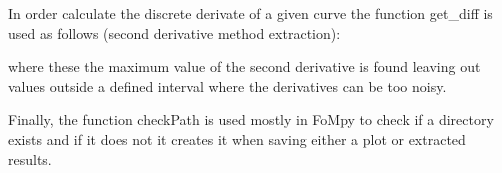\documentclass[letterpaper,10pt,english,openany, oneside]{sphinxmanual}
\begin{document}
%
\begin{sphinxVerbatim}[commandchars=\\\{\}]
   
\PYG{p}{[}\PYG{p}{]}
\end{sphinxVerbatim}

In order calculate the discrete derivate of a given curve the function get\_diff is used as follows (second derivative method
extraction):

%
\begin{sphinxVerbatim}[commandchars=\\\{\}]
     
\PYG{p}{[}\PYG{p}{]}\PYG{p}{[}\PYG{p}{]}
\PYG{p}{[}\PYG{p}{]}\PYG{p}{[}\PYG{p}{]}
  
  
  \PYG{p}{[}\PYG{p}{]}
\end{sphinxVerbatim}

where these the maximum value of the second derivative is found leaving out values outside a defined interval where the derivatives
can be too noisy.

Finally, the function checkPath is used mostly in FoMpy to check if a directory exists and if it does not it creates it when saving
either a plot or extracted results.
\end{document}
